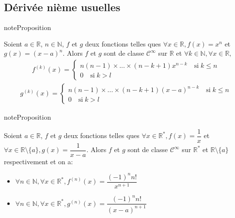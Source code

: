 \documentclass[letterpaper,10pt,french]{jupyterBook}
\begin{document}
\subsection{Dérivée n\sphinxhyphen{}ième usuelles}
\label{\detokenize{complements:derivee-n-ieme-usuelles}}
\begin{sphinxadmonition}{note}{Proposition}

\sphinxAtStartPar
Soient \(a\in \mathbb{R}\), \(n\in \mathbb{N}\), \(f\) et \(g\) deux fonctions telles ques \(\forall x \in \mathbb{R}, f(x) = x^n\) et \(g(x) = (x-a)^n\). Alors \(f\) et \(g\) sont de classe \(\mathscr{C}^\infty\) sur \(\mathbb{R}\) et \(\forall k \in \mathbb{N}, \forall x \in \mathbb{R},\)
\begin{equation*}
\begin{split} 
f^{(k)}(x) =\left\{
\begin{array}{ll}
n(n-1)\times ...\times (n-k+1)x^{n-k} \quad\mbox{si} \;k \leq n\\
0 \quad\mbox{si}\;k>l
\end{array}
\right.
\end{split}
\end{equation*}\begin{equation*}
\begin{split}
g^{(k)}(x) =\left\{
\begin{array}{ll}
n(n-1)\times ...\times (n-k+1)(x-a)^{n-k} \quad\mbox{si} \;k \leq n\\
0 \quad\mbox{si}\;k>l
\end{array}
\right.
\end{split}
\end{equation*}\end{sphinxadmonition}

\begin{sphinxadmonition}{note}{Proposition}

\sphinxAtStartPar
Soient \(a\in \mathbb{R}\), \(f\) et \(g\) deux fonctions telles ques \(\forall x \in \mathbb{R^{*}}, f(x) = \dfrac{1}{x}\) et \(\forall x \in \mathbb{R}\setminus \{a\}, g(x) = \dfrac{1}{x-a}\). Alors \(f\) et \(g\) sont de classe \(\mathscr{C}^\infty\) sur \(\mathbb{R^{*}}\) et \(\mathbb{R}\setminus \{a\}\) respectivement et on a:
\begin{itemize}
\item {} 
\sphinxAtStartPar
\(\forall n \in \mathbb{N}, \forall x \in \mathbb{R^{*}}, f^{(n)}(x) =\dfrac{(-1)^nn!}{x^{n+1}}\)

\item {} 
\sphinxAtStartPar
\(\forall n \in \mathbb{N}, \forall x \in \mathbb{R^{*}}, g^{(n)}(x) =\dfrac{(-1)^nn!}{(x-a)^{n+1}}\)

\end{itemize}
\end{sphinxadmonition}
\end{document}
